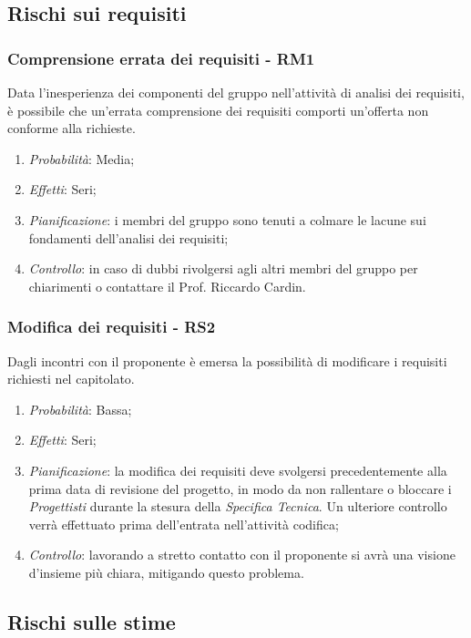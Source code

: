 \subsection{Rischi sui requisiti}
\subsubsection{Comprensione errata dei requisiti - RM1}
Data l'inesperienza dei componenti del gruppo nell'attivit\`a di analisi dei requisiti, \`e possibile che un'errata comprensione dei requisiti comporti un'offerta non conforme alla richieste.
\begin{enumerate}
\item \textit{Probabilit\`a}: Media;
\item \textit{Effetti}: Seri;
\item \textit{Pianificazione}: i membri del gruppo sono tenuti a colmare le lacune sui fondamenti dell'analisi dei requisiti;
\item \textit{Controllo}: in caso di dubbi rivolgersi agli altri membri del gruppo per chiarimenti o contattare il Prof. Riccardo Cardin.
\end{enumerate}

\subsubsection{Modifica dei requisiti - RS2}
Dagli incontri con il proponente \`e emersa la possibilit\`a di modificare i requisiti richiesti nel capitolato.
\begin{enumerate}
\item \textit{Probabilit\`a}: Bassa;
\item \textit{Effetti}: Seri;
\item \textit{Pianificazione}: la modifica dei requisiti deve svolgersi precedentemente alla prima data di revisione del progetto, in modo da non rallentare o bloccare i \textit{Progettisti} durante la stesura della \textit{Specifica Tecnica}. Un ulteriore controllo verr\`a effettuato prima dell'entrata nell'attivit\`a codifica;
\item \textit{Controllo}: lavorando a stretto contatto con il proponente si avr\`a una visione d'insieme pi\`u chiara, mitigando questo problema.
\end{enumerate}

\subsection{Rischi sulle stime}
